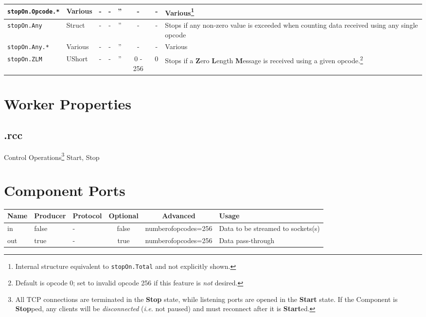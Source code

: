 \begin{landscape}
\begin{minipage}{\textwidth}
\begin{scriptsize}
\begin{tabular}{|p{3.2cm}|p{1.5cm}|c|c|c|c|c|p{7cm}|}
      \hline
      \verb+stopOn.Opcode.*+ &
      Various &
      - &
      - &
      '' &
      - &
      - &
      Various\footnote{\label{stopon}Internal structure equivalent to \texttt{stopOn.Total} and not explicitly shown.} \\
      \hline
      \verb+stopOn.Any+ &
      Struct &
      - &
      - &
      '' &
      - &
      - &
      Stops if any non-zero value is exceeded when counting data received using any single opcode \\
      \hline
      \verb+stopOn.Any.*+ &
      Various &
      - &
      - &
      '' &
      - &
      - &
      Various \\
      \hline
      \verb+stopOn.ZLM+ &
      UShort &
      - &
      - &
      '' &
      0 - 256 &
      0 &
      Stops if a \textbf{Z}ero \textbf{L}ength \textbf{M}essage is received using a given opcode.\footnote{Default is opcode 0; set to invalid opcode 256 if this feature is \textit{not} desired.} \\
      \hline
    \end{tabular}
  \end{scriptsize}
  \end{minipage}
  \section*{Worker Properties}
  \subsection*{\comp.rcc}
  Control Operations\footnote{All TCP connections are terminated in the \textbf{Stop} state, while listening ports are opened in the \textbf{Start} state. If the Component is \textbf{Stop}ped, any clients will be \emph{disconnected} (\textit{i.e.} not paused) and must reconnect after it is \textbf{Start}ed.} Start, Stop

  \section*{Component Ports}
  \begin{scriptsize}
    \begin{tabular}{|M{2cm}|M{1.5cm}|M{4cm}|c|c|M{9cm}|}
      \hline
      Name & Producer & Protocol & Optional & Advanced            & Usage \\
      \hline
      in   & false    & -        & false    & numberofopcodes=256 & Data to be streamed to sockets(s) \\
      \hline
      out  & true     & -        & true     & numberofopcodes=256 & Data pass-through \\
      \hline
    \end{tabular}
  \end{scriptsize}


\end{landscape}
